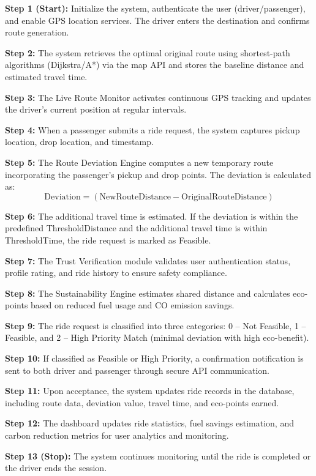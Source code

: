\documentclass[conference]{IEEEtran}
\begin{document}
\textbf{Step 1 (Start):} Initialize the system, authenticate the user (driver/passenger), and enable GPS location services. The driver enters the destination and confirms route generation.

\textbf{Step 2:} The system retrieves the optimal original route using shortest-path algorithms (Dijkstra/A*) via the map API and stores the baseline distance and estimated travel time.

\textbf{Step 3:} The Live Route Monitor activates continuous GPS tracking and updates the driver’s current position at regular intervals.

\textbf{Step 4:} When a passenger submits a ride request, the system captures pickup location, drop location, and timestamp.

\textbf{Step 5:} The Route Deviation Engine computes a new temporary route incorporating the passenger’s pickup and drop points. The deviation is calculated as:
\[
\text{Deviation} = (\text{NewRouteDistance} - \text{OriginalRouteDistance})
\]

\textbf{Step 6:} The additional travel time is estimated. If the deviation is within the predefined ThresholdDistance and the additional travel time is within ThresholdTime, the ride request is marked as Feasible.

\textbf{Step 7:} The Trust Verification module validates user authentication status, profile rating, and ride history to ensure safety compliance.

\textbf{Step 8:} The Sustainability Engine estimates shared distance and calculates eco-points based on reduced fuel usage and CO emission savings.

\textbf{Step 9:} The ride request is classified into three categories: 0 – Not Feasible, 1 – Feasible, and 2 – High Priority Match (minimal deviation with high eco-benefit).

\textbf{Step 10:} If classified as Feasible or High Priority, a confirmation notification is sent to both driver and passenger through secure API communication.

\textbf{Step 11:} Upon acceptance, the system updates ride records in the database, including route data, deviation value, travel time, and eco-points earned.

\textbf{Step 12:} The dashboard updates ride statistics, fuel savings estimation, and carbon reduction metrics for user analytics and monitoring.

\textbf{Step 13 (Stop):} The system continues monitoring until the ride is completed or the driver ends the session.
\end{document}
